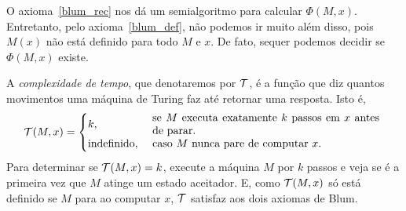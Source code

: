 O axioma~\ref{blum_rec}
nos dá um semialgoritmo para calcular $\Phi(M, x)$.
Entretanto, pelo axioma~\ref{blum_def},
não podemos ir muito além disso,
pois $M(x)$ não está definido para todo $M$ e $x$.
De fato, sequer podemos decidir se $\Phi(M, x)$ existe.

\begin{example}
    \label{complexidade_tempo}
    A \emph{complexidade de tempo},
    que denotaremos por ${\mathcal{T}}$,
    é a função que diz quantos movimentos
    uma máquina de Turing faz até retornar uma resposta.
    Isto é,
    \begin{equation*}
        \PhiDT(M, x) = \begin{cases}
            k, & \text{
                \parbox{0.6\textwidth}{
                    se $M$ executa exatamente $k$ passos em $x$ antes de parar.
                }
            } \\
            \text{indefinido}, & \text{
                \parbox{0.6\textwidth}{
                    caso $M$ nunca pare de computar $x$.
                }
            }
        \end{cases}
    \end{equation*}
    Para determinar se ${\mathcal{T}}(M, x) = k$,
    execute a máquina $M$ por $k$ passos
    e veja se é a primeira vez que
    $M$ atinge um estado aceitador.
    E, como ${\mathcal{T}}(M, x)$ só está definido se $M$ para ao computar $x$,
    ${\mathcal{T}}$ satisfaz aos dois axiomas de Blum.
\end{example}

